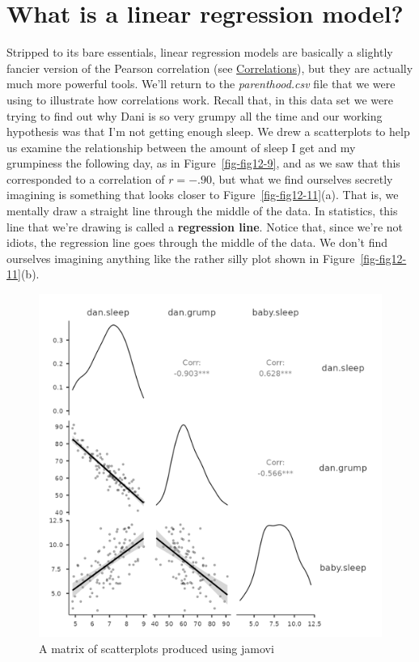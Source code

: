 \documentclass[
  a4paper,
]{book}
\begin{document}
\hypertarget{what-is-a-linear-regression-model}{%
\section{What is a linear regression
model?}\label{what-is-a-linear-regression-model}}

Stripped to its bare essentials, linear regression models are basically
a slightly fancier version of the Pearson correlation (see
\protect\hyperlink{correlations}{Correlations}), but they are actually
much more powerful tools. We'll return to the \emph{parenthood.csv} file
that we were using to illustrate how correlations work. Recall that, in
this data set we were trying to find out why Dani is so very grumpy all
the time and our working hypothesis was that I'm not getting enough
sleep. We drew a scatterplots to help us examine the relationship
between the amount of sleep I get and my grumpiness the following day,
as in Figure~\ref{fig-fig12-9}, and as we saw that this corresponded to
a correlation of \(r = -.90\), but what we find ourselves secretly
imagining is something that looks closer to
Figure~\ref{fig-fig12-11}(a). That is, we mentally draw a straight line
through the middle of the data. In statistics, this line that we're
drawing is called a \textbf{regression line}. Notice that, since we're
not idiots, the regression line goes through the middle of the data. We
don't find ourselves imagining anything like the rather silly plot shown
in Figure~\ref{fig-fig12-11}(b).

\begin{figure}[h!]

\includegraphics[width=1\textwidth,height=\textheight]{images/fig12-10.png} \hfill{}

\caption{\label{fig-fig12-10}A matrix of scatterplots produced using
jamovi}

\end{figure}
\end{document}
